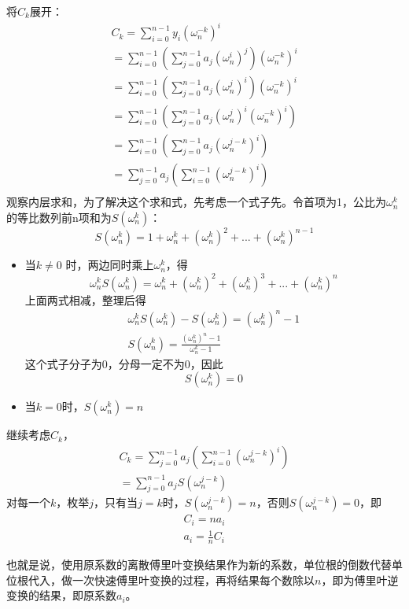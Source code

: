 将$C_k$展开：
\begin{align*}
C_k=\sum_{i=0}^{n-1}y_i(\omega_n^{-k})^i \\
=\sum_{i=0}^{n-1} ( \sum_{j=0}^{n-1}a_j(\omega_n^i)^j )  (\omega_n^{-k})^i   \\
=\sum_{i=0}^{n-1} ( \sum_{j=0}^{n-1}a_j(\omega_n^j)^i )  (\omega_n^{-k})^i   \\
=\sum_{i=0}^{n-1} ( \sum_{j=0}^{n-1}a_j(\omega_n^j)^i (\omega_n^{-k})^i )     \\
=\sum_{i=0}^{n-1} ( \sum_{j=0}^{n-1}a_j(\omega_n^{j-k})^i  )     \\
=\sum_{j=0}^{n-1} a_j(\sum_{i=0}^{n-1}(\omega_n^{j-k})^i )      \\
\end{align*}
观察内层求和，为了解决这个求和式，先考虑一个式子先。令首项为1，公比为$\omega_n^k$的等比数列前n项和为$S(\omega_n^k)$：
$$
S(\omega_n^k)=1+\omega_n^k+(\omega_n^k)^2+...+(\omega_n^k)^{n-1}
$$
\begin{itemize}
\item 当$k\neq0$ 时，两边同时乘上$\omega_n^k$，得
$$
\omega_n^kS(\omega_n^k)=\omega_n^k+(\omega_n^k)^2+(\omega_n^k)^3+...+(\omega_n^k)^{n}
$$
上面两式相减，整理后得
\begin{align*}
\omega_n^kS(\omega_n^k)-S(\omega_n^k)=(\omega_n^k)^{n}-1 \\
S(\omega_n^k)=\frac{(\omega_n^k)^{n}-1 }{\omega_n^k-1}
\end{align*}
 这个式子分子为0，分母一定不为0，因此
$$
S(\omega_{n}^{k})=0
$$

\item 当$k=0$时，$S(\omega_{n}^{k})=n$
\end{itemize}

\vbox{}

继续考虑$C_k$，
\begin{align*}
C_k=\sum_{j=0}^{n-1} a_j(\sum_{i=0}^{n-1}(\omega_n^{j-k})^i ) \\
=\sum_{j=0}^{n-1} a_jS(\omega_{n}^{j-k})
\end{align*}
对每一个$k$，枚举$j$，只有当$j=k$时，$S(\omega_{n}^{j-k})=n$，否则$S(\omega_{n}^{j-k})=0$，即
\begin{align*}
C_i=na_i  \\
a_i=\frac{1}{n}C_i
\end{align*}

也就是说，{\heiti 使用原系数的离散傅里叶变换结果作为新的系数，单位根的倒数代替单位根代入，做一次快速傅里叶变换的过程，再将结果每个数除以$n$}，即为傅里叶逆变换的结果，即原系数$a_i$。

